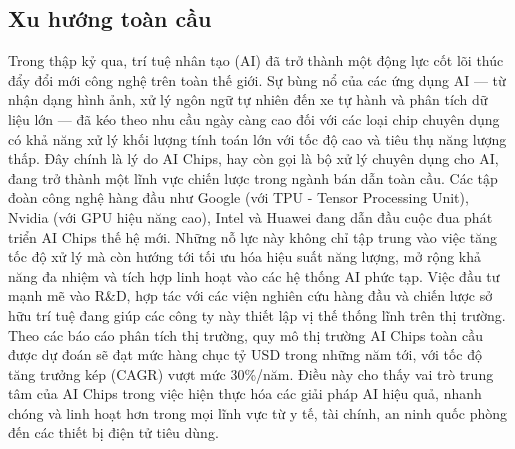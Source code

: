 \documentclass[a4paper]{article}
\begin{document}
\subsection{Xu hướng toàn cầu}
Trong thập kỷ qua, trí tuệ nhân tạo (AI) đã trở thành một động lực cốt lõi thúc đẩy đổi mới công nghệ trên toàn thế giới. Sự bùng nổ của các ứng dụng AI — từ nhận dạng hình ảnh, xử lý ngôn ngữ tự nhiên đến xe tự hành và phân tích dữ liệu lớn — đã kéo theo nhu cầu ngày càng cao đối với các loại chip chuyên dụng có khả năng xử lý khối lượng tính toán lớn với tốc độ cao và tiêu thụ năng lượng thấp. Đây chính là lý do AI Chips, hay còn gọi là bộ xử lý chuyên dụng cho AI, đang trở thành một lĩnh vực chiến lược trong ngành bán dẫn toàn cầu.
Các tập đoàn công nghệ hàng đầu như Google (với TPU - Tensor Processing Unit), Nvidia (với GPU hiệu năng cao), Intel và Huawei đang dẫn đầu cuộc đua phát triển AI Chips thế hệ mới. Những nỗ lực này không chỉ tập trung vào việc tăng tốc độ xử lý mà còn hướng tới tối ưu hóa hiệu suất năng lượng, mở rộng khả năng đa nhiệm và tích hợp linh hoạt vào các hệ thống AI phức tạp. Việc đầu tư mạnh mẽ vào R\&D, hợp tác với các viện nghiên cứu hàng đầu và chiến lược sở hữu trí tuệ đang giúp các công ty này thiết lập vị thế thống lĩnh trên thị trường.
Theo các báo cáo phân tích thị trường, quy mô thị trường AI Chips toàn cầu được dự đoán sẽ đạt mức hàng chục tỷ USD trong những năm tới, với tốc độ tăng trưởng kép (CAGR) vượt mức 30\%/năm. Điều này cho thấy vai trò trung tâm của AI Chips trong việc hiện thực hóa các giải pháp AI hiệu quả, nhanh chóng và linh hoạt hơn trong mọi lĩnh vực từ y tế, tài chính, an ninh quốc phòng đến các thiết bị điện tử tiêu dùng.
\end{document}
